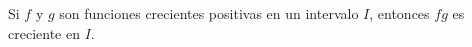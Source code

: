 \item Si $f$ y $g$ son funciones crecientes positivas en un intervalo $I$, entonces $fg$ es creciente en $I$.
